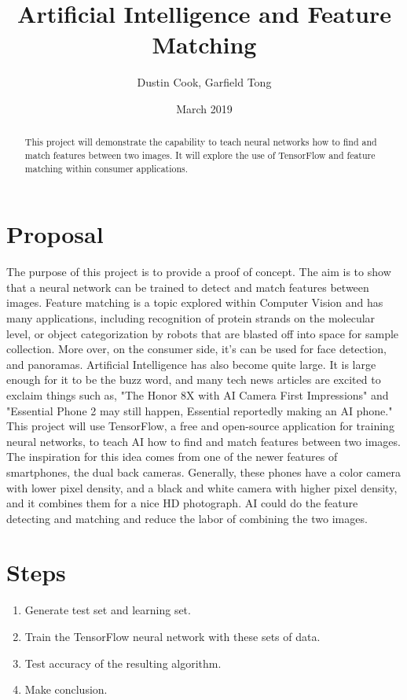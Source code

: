 \documentclass[notitlepage]{report}
\title{Artificial Intelligence and Feature Matching}
\author{Dustin Cook, Garfield Tong}
\date{March \nth{6} 2019}
\begin{document}
\maketitle
\thispagestyle{empty}

\begin{abstract}
This project will demonstrate the capability to teach neural networks how to find and match features between two images. It will explore the use of TensorFlow and feature matching within consumer applications. 
\end{abstract}

\section*{Proposal}
The purpose of this project is to provide a proof of concept. The aim is to show that a neural network can be trained to detect and match features between images. Feature matching is a topic explored within Computer Vision and has many applications, including recognition of protein strands on the molecular level, or object categorization by robots that are blasted off into space for sample collection. More over, on the consumer side, it's can be used for face detection, and panoramas. Artificial Intelligence has also become quite large. It is large enough for it to be the buzz word, and many tech news articles are excited to exclaim things such as, "The Honor 8X with AI Camera First Impressions" and "Essential Phone 2 may still happen, Essential reportedly making an AI phone." This project will use TensorFlow, a free and open-source application for training neural networks, to teach AI how to find and match features between two images. The inspiration for this idea comes from one of the newer features of smartphones, the dual back cameras. Generally, these phones have a color camera with lower pixel density, and a black and white camera with higher pixel density, and it combines them for a nice HD photograph. AI could do the feature detecting and matching and reduce the labor of combining the two images.

\section*{Steps}
\begin{enumerate}
  \item Generate test set and learning set. 
  \item Train the TensorFlow neural network with these sets of data.
  \item Test accuracy of the resulting algorithm.
  \item Make conclusion.
\end{enumerate}
\end{document}
